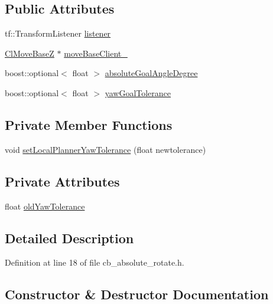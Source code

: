 \subsection*{Public Attributes}
\begin{DoxyCompactItemize}
\item 
tf\+::\+Transform\+Listener \hyperlink{classcl__move__base__z_1_1CbAbsoluteRotate_ad946bb6486dc35baf03ec1cc430a3406}{listener}
\item 
\hyperlink{classcl__move__base__z_1_1ClMoveBaseZ}{Cl\+Move\+BaseZ} $\ast$ \hyperlink{classcl__move__base__z_1_1CbAbsoluteRotate_a8ddbef73316ff96f30493b28b5627e35}{move\+Base\+Client\+\_\+}
\item 
boost\+::optional$<$ float $>$ \hyperlink{classcl__move__base__z_1_1CbAbsoluteRotate_ad5d0e21549940444e1cb525cda73329a}{absolute\+Goal\+Angle\+Degree}
\item 
boost\+::optional$<$ float $>$ \hyperlink{classcl__move__base__z_1_1CbAbsoluteRotate_a8d8b5b9c2c821efe101bb07c96c4bdd3}{yaw\+Goal\+Tolerance}
\end{DoxyCompactItemize}
\subsection*{Private Member Functions}
\begin{DoxyCompactItemize}
\item 
void \hyperlink{classcl__move__base__z_1_1CbAbsoluteRotate_aba8d93d615ccd43acd0684f8e88e2209}{set\+Local\+Planner\+Yaw\+Tolerance} (float newtolerance)
\end{DoxyCompactItemize}
\subsection*{Private Attributes}
\begin{DoxyCompactItemize}
\item 
float \hyperlink{classcl__move__base__z_1_1CbAbsoluteRotate_a2cfcd2978e7923494e2e66107e134e27}{old\+Yaw\+Tolerance}
\end{DoxyCompactItemize}


\subsection{Detailed Description}


Definition at line 18 of file cb\+\_\+absolute\+\_\+rotate.\+h.



\subsection{Constructor \& Destructor Documentation}
\mbox{\label{classcl__move__base__z_1_1CbAbsoluteRotate_a378516095c2ad66f52e50f6d7c32678e}} 
